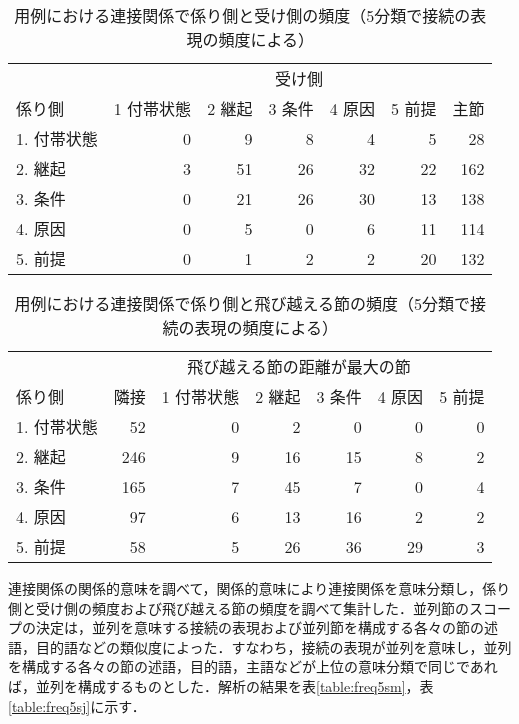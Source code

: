 \begin{table*}
\caption{用例における連接関係で係り側と受け側の頻度（5分類で接続の表現の頻度による）}
\label{table:freq5cm}
\begin{tabular}{|l|r|r|r|r|r|r|}
\hline
\multicolumn{1}{|p{6zw}|}{} & \multicolumn{6}{|c|}{受け側}\\
\cline{2-7}
\multicolumn{1}{|p{6zw}|}{係り側} & \multicolumn{1}{|p{5zw}|}{1 付帯状態} & \multicolumn{1}{|p{4zw}|}{2 継起} & \multicolumn{1}{|p{4zw}|}{3 条件} & \multicolumn{1}{|p{4zw}|}{4 原因} & \multicolumn{1}{|p{4zw}|}{5 前提} & \multicolumn{1}{|p{4zw}|}{主節}\\
\hline
1. 付帯状態 & 0 & 9 & 8 & 4 & 5 & 28 \\
\cline{2-2}
2. 継起 & 3 & 51 & 26 & 32 & 22 & 162 \\
\cline{3-3}
3. 条件 & 0 & 21 & 26 & 30 & 13 & 138 \\
\cline{4-4}
4. 原因 & 0 & 5 & 0 & 6 & 11 & 114 \\
\cline{5-5}
5. 前提 & 0 & 1 & 2 & 2 & 20 & 132 \\
\hline
\end{tabular}
\end{table*}

\begin{table*}
\caption{用例における連接関係で係り側と飛び越える節の頻度（5分類で接続の表現の頻度による）}
\label{table:freq5cj}
\begin{tabular}{|l|r|r|r|r|r|r|}
\hline
\multicolumn{1}{|p{6zw}|}{} & \multicolumn{6}{|c|}{飛び越える節の距離が最大の節}\\
\cline{2-7}
\multicolumn{1}{|p{6zw}|}{係り側} & \multicolumn{1}{|p{4zw}|}{隣接} & \multicolumn{1}{|p{5zw}|}{1 付帯状態} & \multicolumn{1}{|p{4zw}|}{2 継起} & \multicolumn{1}{|p{4zw}|}{3 条件} & \multicolumn{1}{|p{4zw}|}{4 原因} & \multicolumn{1}{|p{4zw}|}{5 前提} \\
\hline
1. 付帯状態 & 52 & 0 & 2 & 0 & 0 & 0 \\
\cline{3-3}
2. 継起 & 246 & 9 & 16 & 15 & 8 & 2 \\
\cline{4-4}
3. 条件 & 165 & 7 & 45 & 7 & 0 & 4 \\
\cline{5-5}
4. 原因 & 97 & 6 & 13 & 16 & 2 & 2 \\
\cline{6-6}
5. 前提 & 58 & 5 & 26 & 36 & 29 & 3 \\
\hline
\end{tabular}
\end{table*}

連接関係の関係的意味を調べて，関係的意味により連接関係を意味分類し，係り側と受け側の頻度および飛び越える節の頻度を調べて集計した．並列節のスコープの決定は，並列を意味する接続の表現および並列節を構成する各々の節の述語，目的語などの類似度によった．すなわち，接続の表現が並列を意味し，並列を構成する各々の節の述語，目的語，主語などが上位の意味分類で同じであれば，並列を構成するものとした．解析の結果を表\ref{table:freq5sm}，表\ref{table:freq5sj}に示す．

